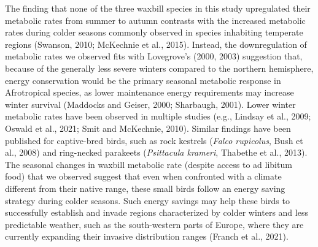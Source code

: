 \documentclass[10pt, twoside]{book} %
\begin{document}
The finding that none of the three waxbill species in this study upregulated their metabolic rates from summer to autumn contrasts with the increased metabolic rates during colder seasons commonly observed in species inhabiting temperate regions (Swanson, 2010; McKechnie et al., 2015). Instead, the downregulation of metabolic rates we observed fits with Lovegrove's (2000, 2003) suggestion that, because of the generally less severe winters compared to the northern hemisphere, energy conservation would be the primary seasonal metabolic response in Afrotropical species, as lower maintenance energy requirements may increase winter survival (Maddocks and Geiser, 2000; Sharbaugh, 2001). Lower winter metabolic rates have been observed in multiple studies (e.g., Lindsay et al., 2009; Oswald et al., 2021; Smit and McKechnie, 2010). Similar findings have been published for captive-bred birds, such as rock kestrels (\textit{Falco rupicolus}, Bush et al., 2008) and ring-necked parakeets (\textit{Psittacula krameri}, Thabethe et al., 2013). The seasonal changes in waxbill metabolic rate (despite access to ad libitum food) that we observed suggest that even when confronted with a climate different from their native range, these small birds follow an energy saving strategy during colder seasons. Such energy savings may help these birds to successfully establish and invade regions characterized by colder winters and less predictable weather, such as the south-western parts of Europe, where they are currently expanding their invasive distribution ranges (Franch et al., 2021).\\
\end{document}
